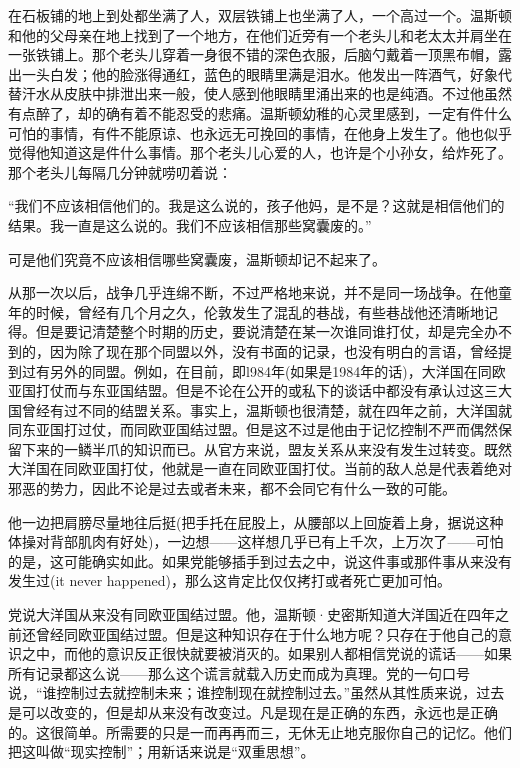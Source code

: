 在石板铺的地上到处都坐满了人，双层铁铺上也坐满了人，一个高过一个。温斯顿和他的父母亲在地上找到了一个地方，在他们近旁有一个老头儿和老太太并肩坐在一张铁铺上。那个老头儿穿着一身很不错的深色衣服，后脑勺戴着一顶黑布帽，露出一头白发；他的脸涨得通红，蓝色的眼睛里满是泪水。他发出一阵酒气，好象代替汗水从皮肤中排泄出来一般，使人感到他眼睛里涌出来的也是纯酒。不过他虽然有点醉了，却的确有着不能忍受的悲痛。温斯顿幼稚的心灵里感到，一定有件什么可怕的事情，有件不能原谅、也永远无可挽回的事情，在他身上发生了。他也似乎觉得他知道这是件什么事情。那个老头儿心爱的人，也许是个小孙女，给炸死了。那个老头儿每隔几分钟就唠叨着说：


“我们不应该相信他们的。我是这么说的，孩子他妈，是不是？这就是相信他们的结果。我一直是这么说的。我们不应该相信那些窝囊废的。”


可是他们究竟不应该相信哪些窝囊废，温斯顿却记不起来了。


从那一次以后，战争几乎连绵不断，不过严格地来说，并不是同一场战争。在他童年的时候，曾经有几个月之久，伦敦发生了混乱的巷战，有些巷战他还清晰地记得。但是要记清楚整个时期的历史，要说清楚在某一次谁同谁打仗，却是完全办不到的，因为除了现在那个同盟以外，没有书面的记录，也没有明白的言语，曾经提到过有另外的同盟。例如，在目前，即l984年(如果是1984年的话)，大洋国在同欧亚国打仗而与东亚国结盟。但是不论在公开的或私下的谈话中都没有承认过这三大国曾经有过不同的结盟关系。事实上，温斯顿也很清楚，就在四年之前，大洋国就同东亚国打过仗，而同欧亚国结过盟。但是这不过是他由于记忆控制不严而偶然保留下来的一鳞半爪的知识而已。从官方来说，盟友关系从来没有发生过转变。既然大洋国在同欧亚国打仗，他就是一直在同欧亚国打仗。当前的敌人总是代表着绝对邪恶的势力，因此不论是过去或者未来，都不会同它有什么一致的可能。


他一边把肩膀尽量地往后挺(把手托在屁股上，从腰部以上回旋着上身，据说这种体操对背部肌肉有好处)，一边想——这样想几乎已有上千次，上万次了——可怕的是，这可能确实如此。如果党能够插手到过去之中，说这件事或那件事从来没有发生过(it never happened)，那么这肯定比仅仅拷打或者死亡更加可怕。


党说大洋国从来没有同欧亚国结过盟。他，温斯顿·史密斯知道大洋国近在四年之前还曾经同欧亚国结过盟。但是这种知识存在于什么地方呢？只存在于他自己的意识之中，而他的意识反正很快就要被消灭的。如果别人都相信党说的谎话——如果所有记录都这么说——那么这个谎言就载入历史而成为真理。党的一句口号说，“谁控制过去就控制未来；谁控制现在就控制过去。”虽然从其性质来说，过去是可以改变的，但是却从来没有改变过。凡是现在是正确的东西，永远也是正确的。这很简单。所需要的只是一而再再而三，无休无止地克服你自己的记忆。他们把这叫做“现实控制”；用新话来说是“双重思想”。


